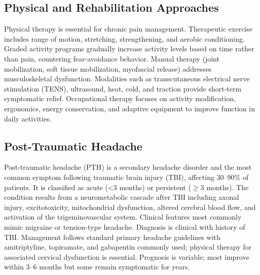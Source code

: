 \subsection{Physical and Rehabilitation Approaches}
\label{sec:Physical and Rehabilitation Approaches}

Physical therapy is essential for chronic pain management. Therapeutic exercise includes range of motion, stretching, strengthening, and aerobic conditioning. Graded activity programs gradually increase activity levels based on time rather than pain, countering fear-avoidance behavior. Manual therapy (joint mobilization, soft tissue mobilization, myofascial release) addresses musculoskeletal dysfunction. Modalities such as transcutaneous electrical nerve stimulation (TENS), ultrasound, heat, cold, and traction provide short-term symptomatic relief. Occupational therapy focuses on activity modification, ergonomics, energy conservation, and adaptive equipment to improve function in daily activities.

\subsection{Post-Traumatic Headache}
\label{sec:Post-Traumatic Headache}
Post-traumatic headache (PTH) is a secondary headache disorder and the most common symptom following traumatic brain injury (TBI), affecting 30--90\% of patients. It is classified as acute (<3 months) or persistent ($\ge$3 months). The condition results from a neurometabolic cascade after TBI including axonal injury, excitotoxicity, mitochondrial dysfunction, altered cerebral blood flow, and activation of the trigeminovascular system. Clinical features most commonly mimic migraine or tension-type headache. Diagnosis is clinical with history of TBI. Management follows standard primary headache guidelines with amitriptyline, topiramate, and gabapentin commonly used; physical therapy for associated cervical dysfunction is essential. Prognosis is variable; most improve within 3--6 months but some remain symptomatic for years.


